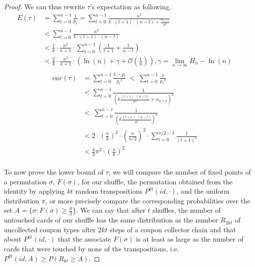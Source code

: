 \documentclass{llncs}
\begin{document}
\begin{proof}
We can thus rewrite $\tau$'s expectation as following.
\begin{align*}
 E(\tau) &= \sum_{t=0}^{n-1} \frac{1}{p_{t}} = \sum_{t=0}^{n-1} \frac{n^2}{k \cdot (t+1)\cdot(n-t) + \frac{\alpha_{n,t,k}}{n^2}}&\\
 &< \sum_{t=0}^{n-1} \frac{n^2}{k \cdot (t+1)\cdot(n-t)}  &\\
 &< \frac{1}{k} \cdot \frac{n^2}{n+1} \cdot  \sum_{t=0}^{n-1} \left ( \frac{1}{t+1} + \frac{1}{n-t} \right ) &\\
 &< \frac{2}{k} \cdot \frac{n^2}{n+1} \cdot \left( \ln(n) + \gamma +\mathcal{O}(\frac{1}{n}) \right), \gamma = \lim_{n \to \infty} H_n - \ln(n)& \\
 \end{align*}
 \begin{align*}
 var(\tau) &= \sum_{t=0}^{n-1}\frac{1-p_t}{{p_t}^2}\ <\  \sum_{t=0}^{n-1}\frac{1}{{p_t}^2} &\\
 &< \sum_{t=0}^{n-1}\frac{1}{\left ( k \frac{(t+1)\cdot(n-t)}{n^2} + \alpha_{n,t,k}\right )^2}\\\
 &<\ \sum_{t=0}^{n-1} \frac{1 }{\left ( k \frac{(t+1)\cdot(n-t)}{n^2} \right )^2} &\\
 &< 2 \cdot \left (\frac{n}{k} \right )^2 \cdot \left (\frac{n}{n/2} \right )^2 \cdot \sum_{t=0}^{n/2-1} \frac{1}{(t+1)^2} &\\
 &< \frac{4}{3} \pi^2 \cdot \left (\frac{n}{k} \right )^2 
\end{align*}
\\

To now prove the lower bound of $\tau$, we will compare the number of fixed points of a permutation $\sigma$, $F(\sigma)$, for our shuffle, the permutation
obtained from the identity by applying $kt$ random transpositions $ P^{kt}(id, \cdot)$, and the uniform distribution $\pi$, or more precisely compare the corresponding probabilities over the set $A=\{\sigma : F(\sigma) \geq \frac{\mu}{2} \}$.
We can say that after $t$ shuffles, the number of untouched cards of our shuffle has the same distribution as the number $R_{2kt}$ of uncollected coupon types after $2kt$ steps of a coupon collector chain
and that about $ P^{kt}(id, \cdot)$ that the associate $F(\sigma)$ is at least as large as the number of cards that were touched by none of the transpositions, i.e. $P^{kt}(id,A) \geq P(R_{kt}\geq A) $.


\end{proof}
\end{document}
